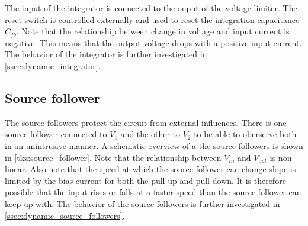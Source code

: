

The input of the integrator is connected to the ouput of the voltage limiter. The reset switch is controlled externally and used to reset the integration capacitance $C_{fb}$. Note that the relationship between change in voltage and input current is negative. This means that the output voltage drops with a positive input current. The behavior of the integrator is further investigated in \cref{ssec:dynamic_integrator}.

\subsection{Source follower}\label{ssec:source_follower}
The source followers protect the circuit from external influences. There is one source follower connected to $V_1$ and  the other to $V_2$ to be able to oberserve both in an unintrusive manner. A schematic overview of a the source followers is shown in \cref{tkz:source_follower}. Note that the relationship between $V_{in}$ and $V_{out}$ is non-linear. Also note that the speed at which the source follower can change slope is limited by the bias current for both the pull up and pull down. It is therefore possible that the input rises or falls at a faster speed than the source follower can keep up with. The behavior of the source followers is further investigated in \cref{ssec:dynamic_source_followers}. 



